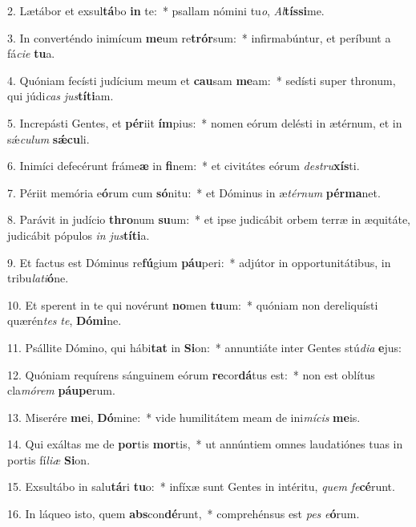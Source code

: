 2. Lætábor et exsul\textbf{tá}bo \textbf{in} te:~*  psallam nómini tu\textit{o}, \textit{Al}\textbf{tís}\textbf{si}me.\

3. In converténdo inimícum \textbf{me}um re\textbf{trór}sum:~*  infirmabúntur, et períbunt a fá\textit{ci}\textit{e} \textbf{tu}a.\

4. Quóniam fecísti judícium meum et \textbf{cau}sam \textbf{me}am:~*  sedísti super thronum, qui júdi\textit{cas} \textit{jus}\textbf{tí}\textbf{ti}am.\

5. Increpásti Gentes, et \textbf{pér}iit \textbf{ím}pius:~*  nomen eórum delésti in ætérnum, et in sǽ\textit{cu}\textit{lum} \textbf{sǽ}\textbf{cu}li.\

6. Inimíci defecérunt fráme\textbf{æ} in \textbf{fi}nem:~*  et civitátes eórum \textit{de}\textit{stru}\textbf{xís}ti.\

7. Périit memória e\textbf{ó}rum cum \textbf{só}nitu:~*  et Dóminus in æ\textit{tér}\textit{num} \textbf{pér}\textbf{ma}net.\

8. Parávit in judício \textbf{thro}num \textbf{su}um:~*  et ipse judicábit orbem terræ in æquitáte, judicábit pópulos \textit{in} \textit{jus}\textbf{tí}\textbf{ti}a.\

9. Et factus est Dóminus re\textbf{fú}gium \textbf{páu}peri:~*  adjútor in opportunitátibus, in tribu\textit{la}\textit{ti}\textbf{ó}ne.\

10. Et sperent in te qui novérunt \textbf{no}men \textbf{tu}um:~*  quóniam non dereliquísti quærén\textit{tes} \textit{te}, \textbf{Dó}\textbf{mi}ne.\

11. Psállite Dómino, qui hábi\textbf{tat} in \textbf{Si}on:~*  annuntiáte inter Gentes stú\textit{di}\textit{a} \textbf{e}jus:\

12. Quóniam requírens sánguinem eórum \textbf{re}cor\textbf{dá}tus est:~*  non est oblítus cla\textit{mó}\textit{rem} \textbf{páu}\textbf{pe}rum.\

13. Miserére \textbf{me}i, \textbf{Dó}mine:~*  vide humilitátem meam de ini\textit{mí}\textit{cis} \textbf{me}is.\

14. Qui exáltas me de \textbf{por}tis \textbf{mor}tis,~*  ut annúntiem omnes laudatiónes tuas in portis fí\textit{li}\textit{æ} \textbf{Si}on.\

15. Exsultábo in salu\textbf{tá}ri \textbf{tu}o:~*  infíxæ sunt Gentes in intéritu, \textit{quem} \textit{fe}\textbf{cé}runt.\

16. In láqueo isto, quem \textbf{abs}con\textbf{dé}runt,~*  comprehénsus est \textit{pes} \textit{e}\textbf{ó}rum.\

